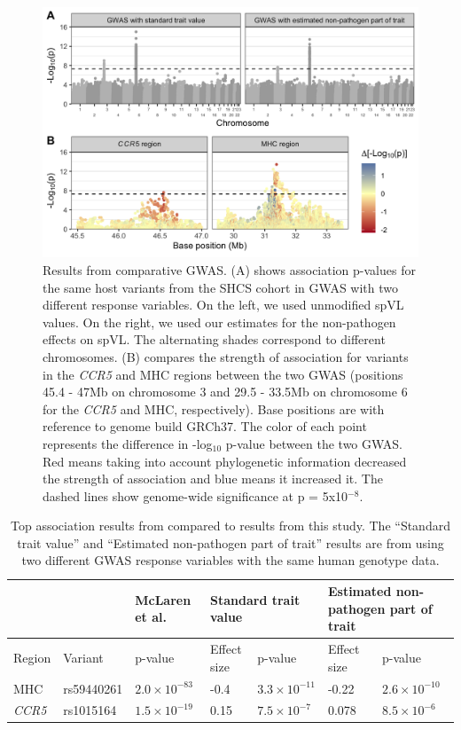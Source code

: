 \documentclass[]{article}
\begin{document}
\begin{doublespace}
\begin{figure}[H]
	\begin{center}
		\includegraphics[width=0.7\linewidth]{figures/gwas_results}
		\caption{Results from comparative GWAS. (A) shows association p-values for the same host variants from the SHCS cohort in GWAS with two different response variables. On the left, we used unmodified spVL values. On the right, we used our estimates for the non-pathogen effects on spVL. The alternating shades correspond to different chromosomes. (B) compares the strength of association for variants in the \emph{CCR5} and MHC regions between the two GWAS (positions 45.4 - 47Mb on chromosome 3 and 29.5 - 33.5Mb on chromosome 6 for the \emph{CCR5} and MHC, respectively). Base positions are with reference to genome build GRCh37. The color of each point represents the difference in -log$_{10}$ p-value between the two GWAS. Red means taking into account phylogenetic information decreased the strength of association and blue means it increased it. The dashed lines show genome-wide significance at p = 5x10$^{-8}$.}
		\label{fig:gwas-results}
	\end{center}
\end{figure}

\begin{table}[H]
\centering
\caption{Top association results from \citet{McLaren2015} compared to results from this study. The ``Standard trait value'' and ``Estimated non-pathogen part of trait'' results are from using two different GWAS response variables with the same human genotype data.}
\begin{tabular}{p{1cm}p{1.8cm}p{2.4cm}p{1.7cm}p{1.8cm}p{1.7cm}p{1.8cm}} %
\hline
& & McLaren et al.  & \multicolumn{2}{l}{Standard trait value} & \multicolumn{2}{l}{Estimated non-pathogen part of trait} \\ 
  \hline
 Region & Variant & p-value & Effect size & p-value & Effect size & p-value \\
  \hline
    MHC & rs59440261 & $2.0 \times 10^{-83}$ & -0.4 & $3.3 \times 10^{-11}$ & -0.22 & $2.6 \times 10^{-10}$ \\ 
    \emph{CCR5} & rs1015164 & $1.5 \times 10^{-19}$ & 0.15 & $7.5 \times 10^{-7}$ & 0.078 & $8.5 \times 10^{-6}$ \\ 
   \hline
\end{tabular}
\label{tab:comp-gwas-mclaren-snps}
\end{table}


\end{doublespace}
\end{document}
